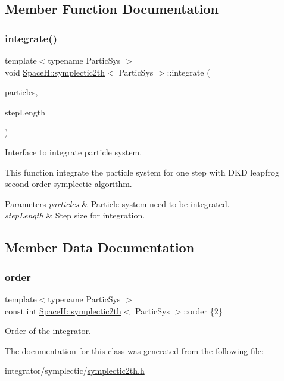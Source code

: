 \subsection{Member Function Documentation}
\mbox{\label{class_space_h_1_1symplectic2th_a966295cb14c383d9ae1d1d99840f7613}} 
\subsubsection{\texorpdfstring{integrate()}{integrate()}}
{\footnotesize\ttfamily template$<$typename Partic\+Sys $>$ \\
void \mbox{\hyperlink{class_space_h_1_1symplectic2th}{Space\+H\+::symplectic2th}}$<$ Partic\+Sys $>$\+::integrate (\begin{DoxyParamCaption}\item[{Partic\+Sys \&}]{particles,  }\item[{\mbox{\hyperlink{class_space_h_1_1symplectic2th_a744708fc201c6970effe4d0b011973e9}{Scalar}}}]{step\+Length }\end{DoxyParamCaption})}



Interface to integrate particle system. 

This function integrate the particle system for one step with D\+KD leapfrog second order symplectic algorithm. 
\begin{DoxyParams}{Parameters}
{\em particles} & \mbox{\hyperlink{struct_space_h_1_1_particle}{Particle}} system need to be integrated. \\
\hline
{\em step\+Length} & Step size for integration. \\
\hline
\end{DoxyParams}


\subsection{Member Data Documentation}
\mbox{\label{class_space_h_1_1symplectic2th_a49d477ddc7a7009d5f4dfc1d88f2e52b}} 
\subsubsection{\texorpdfstring{order}{order}}
{\footnotesize\ttfamily template$<$typename Partic\+Sys $>$ \\
const int \mbox{\hyperlink{class_space_h_1_1symplectic2th}{Space\+H\+::symplectic2th}}$<$ Partic\+Sys $>$\+::order \{2\}\hspace{0.3cm}{\ttfamily [static]}}



Order of the integrator. 



The documentation for this class was generated from the following file\+:\begin{DoxyCompactItemize}
\item 
integrator/symplectic/\mbox{\hyperlink{symplectic2th_8h}{symplectic2th.\+h}}\end{DoxyCompactItemize}
